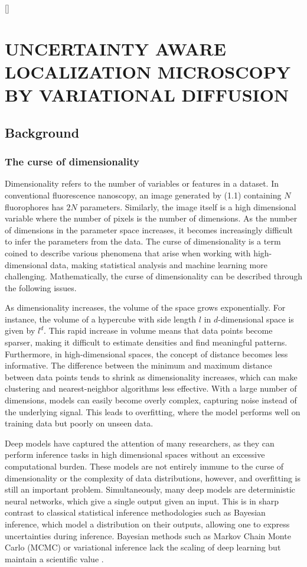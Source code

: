 []

\chapter{UNCERTAINTY AWARE LOCALIZATION MICROSCOPY BY VARIATIONAL DIFFUSION}

\section{Background}

\subsection{The curse of dimensionality}

Dimensionality refers to the number of variables or features in a dataset. In conventional fluorescence nanoscopy, an image generated by (1.1) containing $N$ fluorophores has $2N$ parameters. Similarly, the image itself is a high dimensional variable where the number of pixels is the number of dimensions. As the number of dimensions in the parameter space increases, it becomes increasingly difficult to infer the parameters from the data. The curse of dimensionality is a term coined to describe various phenomena that arise when working with high-dimensional data, making statistical analysis and machine learning more challenging. Mathematically, the curse of dimensionality can be described through the following issues.

As dimensionality increases, the volume of the space grows exponentially. For instance, the volume of a hypercube with side length $l$ in $d$-dimensional space is given by $l^d$. This rapid increase in volume means that data points become sparser, making it difficult to estimate densities and find meaningful patterns. Furthermore, in high-dimensional spaces, the concept of distance becomes less informative. The difference between the minimum and maximum distance between data points tends to shrink as dimensionality increases, which can make clustering and nearest-neighbor algorithms less effective. With a large number of dimensions, models can easily become overly complex, capturing noise instead of the underlying signal. This leads to overfitting, where the model performs well on training data but poorly on unseen data.

Deep models have captured the attention of many researchers, as they can perform inference tasks in high dimensional spaces without an excessive computational burden. These models are not entirely immune to the curse of dimensionality or the complexity of data distributions, however, and overfitting is still an important problem. Simultaneously, many deep models are deterministic neural networks, which give a single output given an input. This is in sharp contrast to classical statistical inference methodologies such as Bayesian inference, which model a distribution on their outputs, allowing one to express uncertainties during inference. Bayesian methods such as Markov Chain Monte Carlo (MCMC) or variational inference lack the scaling of deep learning but maintain a scientific value \parencite{Kingma2013}.

